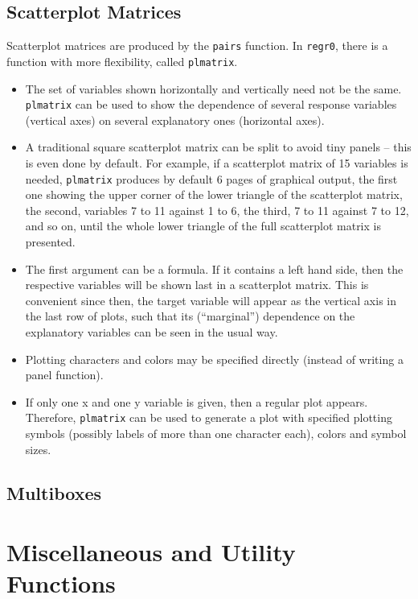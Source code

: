 \documentclass[11pt]{article}
\providecommand{\T}{\texttt}
\providecommand{\Vneed}[1]{\penalty-5000\vskip#1%
\penalty-5000\vspace{-#1}}
\begin{document}
\subsection{Scatterplot Matrices}
Scatterplot matrices are produced by the \T{pairs} function.
In \T{regr0}, there is a function with more flexibility, called
\T{plmatrix}.
\begin{itemize}
\item 
  The set of variables shown horizontally and vertically need not be the
  same. \T{plmatrix} can be used to show the dependence of several 
  response variables (vertical axes) on several explanatory ones
  (horizontal axes).
\item
  A traditional square scatterplot matrix can be split to avoid
  tiny panels -- this is even done by default. For example, if 
  a scatterplot matrix of 15 variables is needed, 
  \T{plmatrix} produces by default 6 pages of graphical output,
  the first one showing the %
  upper corner of the lower triangle of the scatterplot matrix,
  the second, variables 7 to 11 against 1 to 6, the third, 
  7 to 11 against 7 to 12, and so on, until the whole lower triangle
  of the full scatterplot matrix is presented.
\item
  The first argument can be a formula. If it contains a left hand side,
  then the respective variables will be shown last in a scatterplot
  matrix. This is convenient since then, the target variable will appear as
  the vertical axis in the last row of plots, such that its (``marginal'')
  dependence on the explanatory variables can be seen in the usual way.
\item
  Plotting characters and colors may be specified directly (instead of 
  writing a panel function).
\item
  If only one x and one y variable is given, then a regular plot appears.
  Therefore, \T{plmatrix} can be used to generate a plot with specified
  plotting symbols (possibly labels of more than one character each),
  colors and symbol sizes.
\end{itemize}

\subsection{Multiboxes}

\Vneed{50mm}
\section{Miscellaneous and Utility Functions}
\end{document}
